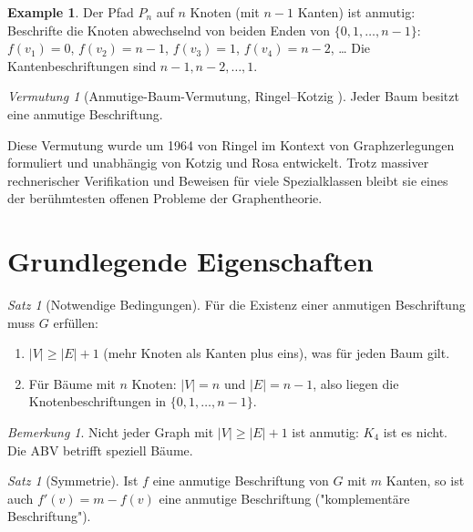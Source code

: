 \documentclass[12pt,a4paper]{amsart}
\theoremstyle{definition}
\newtheorem{example}[theorem]{Example}
\theoremstyle{remark}
\newtheorem{satz}[theorem]{Satz}
\newtheorem{vermutung}[theorem]{Vermutung}
\newtheorem{bemerkung}[theorem]{Bemerkung}
\begin{document}
\begin{example}\label{bsp:pfad}
Der Pfad $P_n$ auf $n$ Knoten (mit $n-1$ Kanten) ist anmutig: Beschrifte die
Knoten abwechselnd von beiden Enden von $\{0, 1, \ldots, n-1\}$:
$f(v_1) = 0$, $f(v_2) = n-1$, $f(v_3) = 1$, $f(v_4) = n-2$, \ldots
Die Kantenbeschriftungen sind $n-1, n-2, \ldots, 1$.
\end{example}

\begin{vermutung}[Anmutige-Baum-Vermutung, Ringel--Kotzig \cite{RingelKotzig1964}]
\label{verm:abv}
Jeder Baum besitzt eine anmutige Beschriftung.
\end{vermutung}

Diese Vermutung wurde um 1964 von Ringel im Kontext von Graphzerlegungen formuliert
und unabhängig von Kotzig und Rosa \cite{Rosa1967} entwickelt. Trotz massiver
rechnerischer Verifikation und Beweisen für viele Spezialklassen bleibt sie eines
der berühmtesten offenen Probleme der Graphentheorie.

\section{Grundlegende Eigenschaften}\label{sec:grundeig}

\begin{satz}[Notwendige Bedingungen]\label{satz:notwendig}
Für die Existenz einer anmutigen Beschriftung muss $G$ erfüllen:
\begin{enumerate}[label=(\roman*)]
  \item $|V| \geq |E| + 1$ (mehr Knoten als Kanten plus eins), was für jeden
        Baum gilt.
  \item Für Bäume mit $n$ Knoten: $|V| = n$ und $|E| = n - 1$, also liegen die
        Knotenbeschriftungen in $\{0, 1, \ldots, n-1\}$.
\end{enumerate}
\end{satz}

\begin{bemerkung}
Nicht jeder Graph mit $|V| \geq |E| + 1$ ist anmutig: $K_4$ ist es nicht. Die
ABV betrifft speziell Bäume.
\end{bemerkung}

\begin{satz}[Symmetrie]\label{satz:symmetrie}
Ist $f$ eine anmutige Beschriftung von $G$ mit $m$ Kanten, so ist auch
$f'(v) = m - f(v)$ eine anmutige Beschriftung ("komplementäre Beschriftung").
\end{satz}
\end{document}
